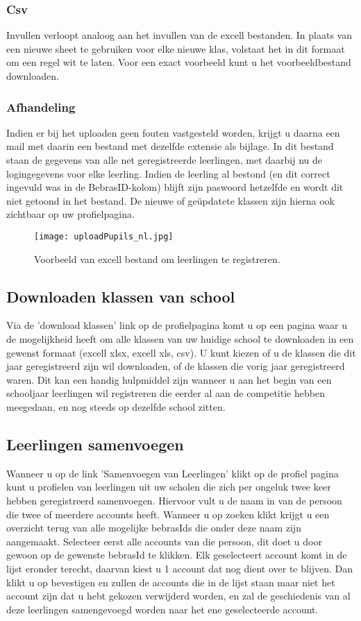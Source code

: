 \documentclass[11pt,a4paper]{report}
\begin{document}
\subsubsection{Csv}
Invullen verloopt analoog aan het invullen van de excell bestanden. In plaats van een nieuwe sheet te gebruiken voor elke nieuwe klas, volstaat het in dit formaat om een regel wit te laten. Voor een exact voorbeeld kunt u het voorbeeldbestand downloaden.
\subsubsection{Afhandeling}
Indien er bij het uploaden geen fouten vastgesteld worden, krijgt u daarna een mail met daarin een bestand met dezelfde extensie als bijlage. In dit bestand staan de gegevens van alle net geregistreerde leerlingen, met daarbij nu de logingegevens voor elke leerling. Indien de leerling al bestond (en dit correct ingevuld was in de BebrasID-kolom) blijft zijn paswoord hetzelfde en wordt dit niet getoond in het bestand. 
De nieuwe of ge\"updatete klassen zijn hierna ook zichtbaar op uw profielpagina.
\begin{figure}[h!]
\centering
\texttt{[image: uploadPupils\_nl.jpg]}
\caption{Voorbeeld van excell bestand om leerlingen te registreren.}
\label{fig:uploadPupils}
\end{figure}

\subsection{Downloaden klassen van school}
Via de 'download klassen' link op de profielpagina komt u op een pagina waar u de mogelijkheid heeft om alle klassen van uw huidige school te downloaden in een gewenst formaat (excell xlsx, excell xls, csv). U kunt kiezen of u de klassen die dit jaar geregistreerd zijn wil downloaden, of de klassen die vorig jaar geregistreerd waren. Dit kan een handig hulpmiddel zijn wanneer u aan het begin van een schooljaar leerlingen wil registreren die eerder al aan de competitie hebben meegedaan, en nog steeds op dezelfde school zitten.

\subsection{Leerlingen samenvoegen}
Wanneer u op de link 'Samenvoegen van Leerlingen' klikt op de profiel pagina kunt u profielen van leerlingen uit uw scholen die zich per ongeluk twee keer hebben geregistreerd samenvoegen. Hiervoor vult u de naam in van de persoon die twee of meerdere accounts heeft. Wanneer u op zoeken klikt krijgt u een overzicht terug van alle mogelijke bebrasIds die onder deze naam zijn aangemaakt. Selecteer eerst alle accounts van die persoon, dit doet u door gewoon op de gewenste bebrasId te klikken. Elk geselecteert account komt in de lijst eronder terecht, daarvan kiest u 1 account dat nog dient over te blijven. Dan klikt u op bevestigen en zullen de accounts die in de lijst staan maar niet het account zijn dat u hebt gekozen verwijderd worden, en zal de geschiedenis van al deze leerlingen samengevoegd worden naar het ene geselecteerde account.
\end{document}
